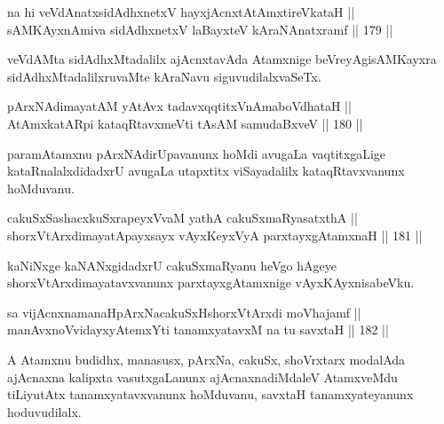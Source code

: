 \begin{shl}
na hi veVdAnatxsidAdhxnetxV hayxjAcnxtAtAmxtireVkataH || \\
sAMKAyxnAmiva sidAdhxnetxV laBayxteV kAraNAnatxramf \hfill || 179 ||  
\end{shl}

\begin{artha}
veVdAMta sidAdhxMtadalilx ajAcnxtavAda Atamxnige beVreyAgi\break sAMKayxra
sidAdhxMtadalilxruvaMte kAraNavu siguvudilalxvaSeTx.
\end{artha}


\begin{shl}
pArxNAdimayatAM yAtAvx tadavxqqtitxVnAmaboVdhataH || \\
AtAmx\s katAR\s pi kataqRtavxmeVti tAsAM samudaBxveV \hfill || 180 ||  
\end{shl}

\begin{artha}
paramAtamxnu pArxNAdirUpavanunx hoMdi avugaLa vaqtitxgaLige
kataRnalalxdidadxrU avugaLa utapxtitx viSayadalilx kataqRtavxvanunx\break
hoMduvanu.
\end{artha}


\begin{shl}
cakuSxSashacxkuSxrapeyxVvaM yathA cakuSxmaRyasatxthA || \\
shorxVtArxdimayatA\s payxsayx vAyxKeyxVyA parxtayxgAtamxnaH \hfill || 181 ||  
\end{shl}

\begin{artha}
kaNiNxge kaNANxgidadxrU cakuSxmaRyanu heVgo hAgeye
shorxVtArxdimayatavxvanunx parxtayxgAtamxnige vAyxKAyxnisabeVku.
\end{artha}

\begin{shl}
sa vijAcnxnamanaHpArxNacakuSxHshorxVtArxdi moVhajamf || \\
manAvxnoV\s vidayxyA\s \s temxYti tanamxyatavxM na tu savxtaH \hfill || 182 ||  
\end{shl}

\begin{artha}
A Atamxnu budidhx, manasusx, pArxNa, cakuSx, shoVrxtarx modalAda ajAcnaxna kalipxta vasutxgaLanunx ajAcnaxnadiMdaleV AtamxveMdu tiLiyutAtx tanamxyatavxvanunx hoMduvanu, savxtaH tanamxyateyanunx hoduvudilalx.
\end{artha}


